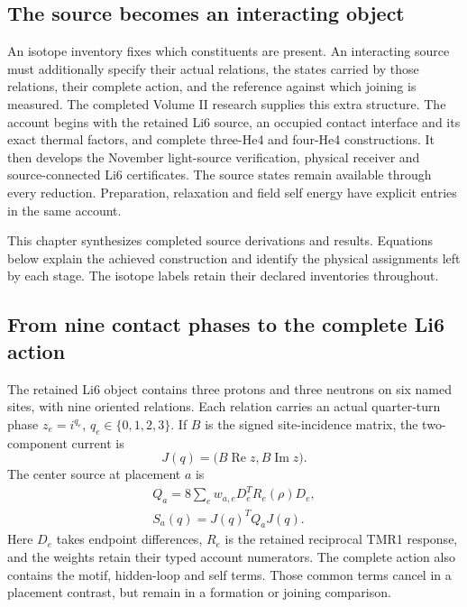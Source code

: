 \label{ch:occupied-nuclear}

\subsection{The source becomes an interacting object}

An isotope inventory fixes which constituents are present. An interacting
source must additionally specify their actual relations, the states carried
by those relations, their complete action, and the reference against which
joining is measured. The completed Volume II research supplies this extra
structure. The account begins with the retained Li6 source, an occupied contact
interface and its exact thermal factors, and complete three-He4 and
four-He4 constructions. It then develops the November light-source
verification, physical receiver and source-connected Li6 certificates. The source states remain available
through every reduction. Preparation, relaxation and field self energy have
explicit entries in the same account.

This chapter synthesizes completed source derivations and results.
Equations below explain the achieved construction and identify the physical
assignments left by each stage.
The isotope labels retain their declared inventories throughout.

\subsection{From nine contact phases to the complete Li6 action}

The retained Li6 object contains three protons and three neutrons on six
named sites, with nine oriented relations. Each relation carries an actual
quarter-turn phase \(z_e=i^{q_e}\), \(q_e\in\{0,1,2,3\}\). If \(B\) is the
signed site-incidence matrix, the two-component current is
\[
 J(q)=\bigl(B\operatorname{Re}z,B\operatorname{Im}z\bigr).
\]
The center source at placement \(a\) is
\[
\begin{gathered}
Q_a=8\sum_e w_{a,e}D_e^{T}R_e(\rho)D_e,\\
 S_a(q)=J(q)^TQ_aJ(q).
\end{gathered}
\]
Here \(D_e\) takes endpoint differences, \(R_e\) is the retained reciprocal
TMR1 response, and the weights retain their typed account numerators.
The complete action also contains the motif, hidden-loop and self terms.
Those common terms cancel in a placement contrast, but remain in a
formation or joining comparison.

